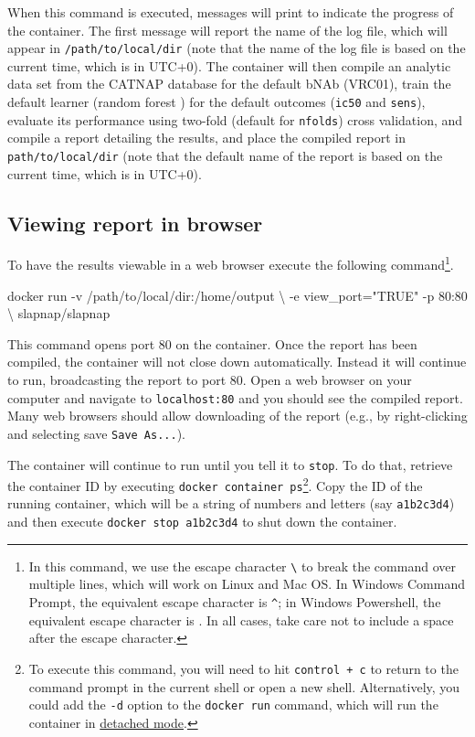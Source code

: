 \documentclass[]{article}
\newenvironment{Shaded}{\begin{snugshade}}{\end{snugshade}}
\newcommand{\StringTok}[1]{\textcolor[rgb]{0.31,0.60,0.02}{#1}}
\newcommand{\ExtensionTok}[1]{#1}
\newcommand{\NormalTok}[1]{#1}
\begin{document}
When this command is executed, messages will print to indicate the
progress of the container. The first message will report the name of the
log file, which will appear in \texttt{/path/to/local/dir} (note that
the name of the log file is based on the current time, which is in
UTC+0). The container will then compile an analytic data set from the
CATNAP database for the default bNAb (VRC01), train the default learner
(random forest \citep{breiman2001}) for the default outcomes
(\texttt{ic50} and \texttt{sens}), evaluate its performance using
two-fold (default for \texttt{nfolds}) cross validation, and compile a
report detailing the results, and place the compiled report in
\texttt{path/to/local/dir} (note that the default name of the report is
based on the current time, which is in UTC+0).

\subsection{Viewing report in browser}\label{sec:webbrowse}

To have the results viewable in a web browser execute the following
command\footnote{In this command, we use the escape character
  \texttt{\textbackslash{}} to break the command over multiple lines,
  which will work on Linux and Mac OS. In Windows Command Prompt, the
  equivalent escape character is \texttt{\^{}}; in Windows Powershell,
  the equivalent escape character is \texttt{\textasciigrave{}}. In all
  cases, take care not to include a space after the escape character.}.

\begin{Shaded}
\begin{Highlighting}[]
\ExtensionTok{docker}\NormalTok{ run -v /path/to/local/dir:/home/output \textbackslash{}}
\NormalTok{           -e view_port=}\StringTok{"TRUE"}\NormalTok{ -p 80:80 \textbackslash{}}
\NormalTok{           slapnap/slapnap}
\end{Highlighting}
\end{Shaded}

This command opens port 80 on the container. Once the report has been
compiled, the container will not close down automatically. Instead it
will continue to run, broadcasting the report to port 80. Open a web
browser on your computer and navigate to \texttt{localhost:80} and you
should see the compiled report. Many web browsers should allow
downloading of the report (e.g., by right-clicking and selecting save
\texttt{Save\ As...}).

The container will continue to run until you tell it to \texttt{stop}.
To do that, retrieve the container ID by executing
\texttt{docker\ container\ ps}\footnote{To execute this command, you
  will need to hit \texttt{control\ +\ c} to return to the command
  prompt in the current shell or open a new shell. Alternatively, you
  could add the \texttt{-d} option to the \texttt{docker\ run} command,
  which will run the container in
  \href{https://docs.docker.com/engine/reference/run/\#detached-vs-foreground}{detached
  mode}.}. Copy the ID of the running container, which will be a string
of numbers and letters (say \texttt{a1b2c3d4}) and then execute
\texttt{docker\ stop\ a1b2c3d4} to shut down the container.
\end{document}
